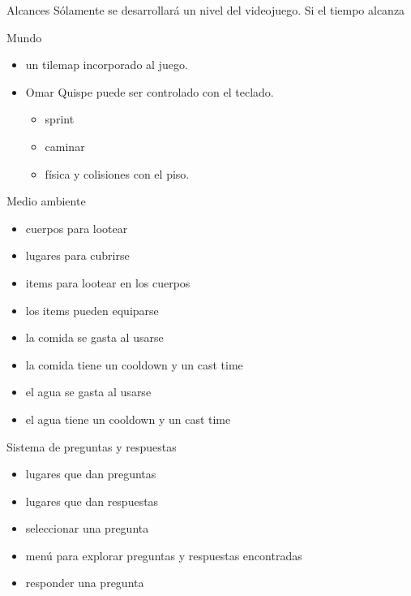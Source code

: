 \begin{section}{Alcances}
  Sólamente se desarrollará un nivel del videojuego. Si el tiempo alcanza

  \begin{subsection}{Mundo}
    \begin{itemize}
    \item un tilemap incorporado al juego.
    \item Omar Quispe puede ser controlado con el teclado.
      \begin{itemize}
      \item sprint
      \item caminar
      \item física y colisiones con el piso.
      \end{itemize}
    \end{itemize}
  \end{subsection}

  \begin{subsection}{Medio ambiente}
    \begin{itemize}
    \item cuerpos para lootear
    \item lugares para cubrirse
    \item items para lootear en los cuerpos
    \item los items pueden equiparse
    \item la comida se gasta al usarse
    \item la comida tiene un cooldown y un cast time
    \item el agua se gasta al usarse
    \item el agua tiene un cooldown y un cast time
    \end{itemize}
  \end{subsection}

  \begin{subsection}{Sistema de preguntas y respuestas}
    \begin{itemize}
    \item lugares que dan preguntas
    \item lugares que dan respuestas
    \item seleccionar una pregunta
    \item menú para explorar preguntas y respuestas encontradas
    \item responder una pregunta
    \end{itemize}
  \end{subsection}


\end{section}
